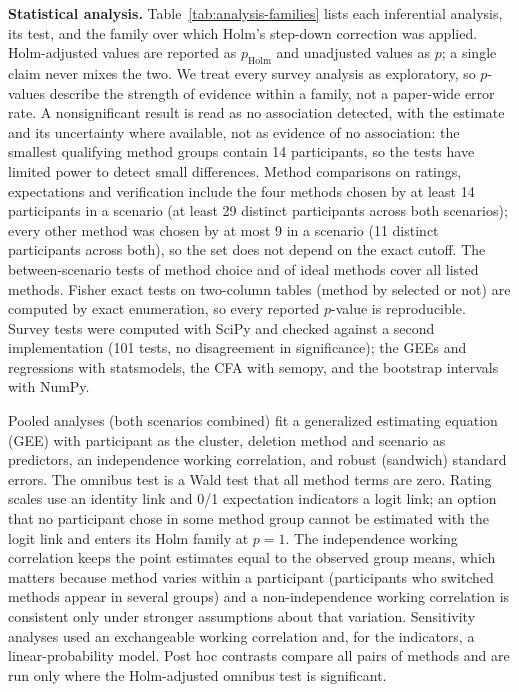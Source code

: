 \documentclass[conference,compsoc]{IEEEtran}
\begin{document}
\textbf{Statistical analysis.} Table~\ref{tab:analysis-families} lists each
inferential analysis, its test, and the family over which Holm's step-down
correction was applied. Holm-adjusted values are reported as
$p_{\mathrm{Holm}}$ and unadjusted values as $p$; a single claim never
mixes the two. We treat every survey analysis as exploratory, so $p$-values
describe the strength of evidence within a family, not a paper-wide error
rate. A nonsignificant result is read as no association detected, with
the estimate and its uncertainty where available, not as evidence of no
association: the smallest qualifying method groups contain 14 participants,
so the tests have limited power to detect small differences. Method
comparisons on ratings, expectations and verification include the four
methods chosen by at least 14 participants in a scenario (at least 29
distinct participants across both scenarios); every other method was chosen by
at most 9 in a scenario (11 distinct participants across both), so the set does
not depend on the exact cutoff. The between-scenario
tests of method choice and of ideal methods cover all listed methods. Fisher
exact tests on two-column tables (method by selected or not) are computed by
exact enumeration, so every reported $p$-value is reproducible. Survey
tests were computed with SciPy and checked against a second implementation
(101 tests, no disagreement in significance); the GEEs and
regressions with statsmodels, the CFA with semopy, and the bootstrap intervals with NumPy.

Pooled analyses (both scenarios combined) fit a generalized estimating
equation (GEE) with participant as the cluster, deletion method and scenario
as predictors, an independence working correlation, and robust (sandwich)
standard errors. The omnibus test is a Wald test that all method terms are
zero. Rating scales use an identity link and 0/1 expectation indicators a
logit link; an option that no participant chose in some method group cannot be
estimated with the logit link and enters its Holm family at $p=1$. The
independence working correlation keeps the point estimates equal to the
observed group means, which matters because method varies within a
participant (participants who switched methods appear in several groups) and
a non-independence working correlation is consistent only under stronger
assumptions about that variation. Sensitivity analyses used an exchangeable
working correlation and, for the indicators, a linear-probability model.
Post hoc contrasts compare all pairs of methods and are run only where the
Holm-adjusted omnibus test is significant.
\end{document}
